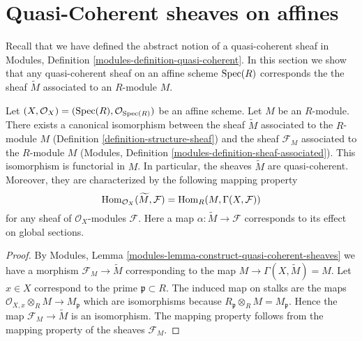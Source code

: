 \section{Quasi-Coherent sheaves on affines}
\label{section-quasi-coherent-affine}

\noindent
Recall that we have defined the abstract notion of a quasi-coherent
sheaf in Modules, Definition \ref{modules-definition-quasi-coherent}.
In this section we show that any quasi-coherent sheaf on an affine
scheme $\mathop{\rm Spec}(R)$ corresponds the the sheaf $\widetilde M$ associated to
an $R$-module $M$.

\begin{lemma}
\label{lemma-compare-constructions}
Let $(X, \mathcal{O}_X) = (\mathop{\rm Spec}(R), \mathcal{O}_{\mathop{\rm Spec}(R)})$
be an affine scheme. Let $M$ be an $R$-module. There exists a canonical
isomorphism between the sheaf $\widetilde M$ associated to the $R$-module
$M$ (Definition \ref{definition-structure-sheaf}) and the sheaf
$\mathcal{F}_M$ associated to the $R$-module $M$
(Modules, Definition \ref{modules-definition-sheaf-associated}).
This isomorphism is functorial in $M$. In particular,
the sheaves $\widetilde M$ are quasi-coherent. Moreover, they
are characterized by the following mapping property
$$
\mathop{\rm Hom}\nolimits_{\mathcal{O}_X}(\widetilde M, \mathcal{F})
=
\mathop{\rm Hom}\nolimits_R(M, \Gamma(X, \mathcal{F}))
$$
for any sheaf of $\mathcal{O}_X$-modules $\mathcal{F}$.
Here a map $\alpha : \widetilde M \to \mathcal{F}$ corresponds
to its effect on global sections.
\end{lemma}

\begin{proof}
By Modules, Lemma \ref{modules-lemma-construct-quasi-coherent-sheaves}
we have a morphism $\mathcal{F}_M \to \widetilde M$ corresponding
to the map $M \to \Gamma(X, \widetilde M) = M$. Let $x \in X$
correspond to the prime $\mathfrak p \subset R$.
The induced map on stalks are the maps
$\mathcal{O}_{X, x} \otimes_R M \to M_{\mathfrak p}$
which are isomorphisms because
$R_{\mathfrak p} \otimes_R M = M_{\mathfrak p}$.
Hence the map $\mathcal{F}_M \to \widetilde M$ is an isomorphism.
The mapping property follows from the mapping property of
the sheaves $\mathcal{F}_M$.
\end{proof}


